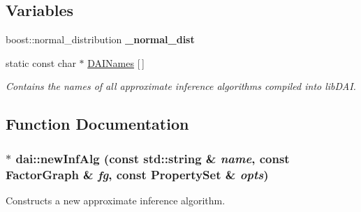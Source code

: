 \subsection*{Variables}
\begin{CompactItemize}
\item 
\hypertarget{namespacedai_db5bd6385f9f88d7f191c8c7dc8d2d74}{
boost::normal\_\-distribution \textbf{\_\-normal\_\-dist}}
\label{namespacedai_db5bd6385f9f88d7f191c8c7dc8d2d74}

\item 
static const char $\ast$ \hyperlink{namespacedai_faf76457d5d1ad9cfd37feb44ae94669}{DAINames} \mbox{[}$\,$\mbox{]}
\begin{CompactList}\small\item\em Contains the names of all approximate inference algorithms compiled into libDAI. \item\end{CompactList}\end{CompactItemize}


\subsection{Function Documentation}
\hypertarget{namespacedai_4b9e5254e7ec388e69aa68dfc54509e0}{
\subsubsection[newInfAlg]{ $\ast$ dai::newInfAlg (const std::string \& {\em name}, \/  const FactorGraph \& {\em fg}, \/  const PropertySet \& {\em opts})}}
\label{namespacedai_4b9e5254e7ec388e69aa68dfc54509e0}


Constructs a new approximate inference algorithm. 


